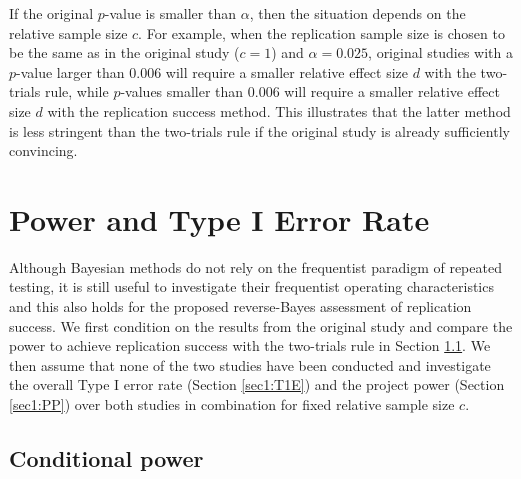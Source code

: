If the original $p$-value is smaller than $\alpha$, then the situation depends
on the relative sample size $c$. For example, when the replication sample size
is chosen to be the same as in the original study ($c=1$) and $\alpha=0.025$,
original studies with a $p$-value larger than $0.006$ will require a smaller
relative effect size $d$ with the two-trials rule, while $p$-values smaller than
$0.006$ will require a smaller relative effect size $d$ with the replication
success method. This illustrates that the latter method is less stringent than
the two-trials rule if the original study is already sufficiently convincing.

\section{Power and Type I Error Rate}\label{sec1:ER}
Although Bayesian methods do not rely on the frequentist paradigm of repeated
testing, it is still useful to investigate their frequentist operating
characteristics \citep{Dawid1982, Rubin1984, Grieve2016} and this also holds for
the proposed reverse-Bayes assessment of replication success. We first condition
on the results from the original study and compare the power to achieve
replication success with the two-trials rule in Section \ref{sec1:powerrep}. We
then assume that none of the two studies have been conducted and investigate the
overall Type I error rate (Section \ref{sec1:T1E}) and the project power (Section
\ref{sec1:PP}) \citep{Maca2002} over both studies in combination for fixed
relative sample size $c$.

\subsection{Conditional power}\label{sec1:powerrep}


